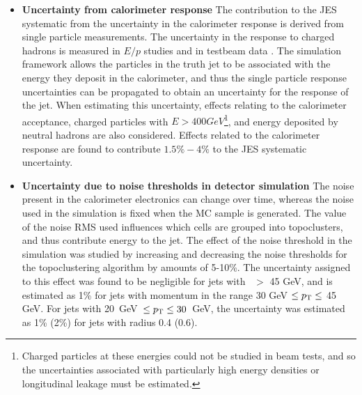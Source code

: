 \begin{itemize}
\item{ \bf Uncertainty from calorimeter response} The contribution to the JES systematic from the uncertainty in the calorimeter response is derived from single particle measurements. The uncertainty in the response to charged hadrons is measured in $E/p$ studies \cite{ATLAS-CONF-2011-028} and in testbeam data \cite{Khramov:1172156}. The simulation framework allows the particles in the truth jet to be associated with the energy they deposit in the calorimeter, and thus the single particle response uncertainties can be propagated to obtain an uncertainty for the response of the jet. When estimating this uncertainty, effects relating to the calorimeter acceptance, charged particles with $E> 400GeV$\footnote{Charged particles at these energies could not be studied in beam tests, and so the uncertainties associated with particularly high energy densities or longitudinal leakage must be estimated.}, and energy deposited by neutral hadrons are also considered. Effects related to the calorimeter response are found to contribute $1.5\% -  4\%$ to the JES systematic uncertainty.

\item{\bf Uncertainty due to noise thresholds in detector simulation} The noise present in the calorimeter electronics can change over time, whereas the noise used in the simulation is fixed when the MC sample is generated. The value of the noise RMS used influences which cells are grouped into topoclusters, and thus contribute energy to the jet. The effect of the noise threshold in the simulation was studied by increasing and decreasing the noise thresholds for the topoclustering algorithm by amounts of 5-10\%. The uncertainty assigned to this effect was found to be negligible for jets with \pt~$>$ 45 GeV, and is estimated as 1\% for jets with momentum in the range 30 GeV $\leq p_{\mathrm{T}} \leq$ 45 GeV. For jets with 20~GeV~$\leq p_{\mathrm{T}} \leq 30$~GeV, the uncertainty was estimated as 1\% (2\%) for jets with radius 0.4 (0.6).

%
%
%
%
%
%
%
%


\end{itemize}
